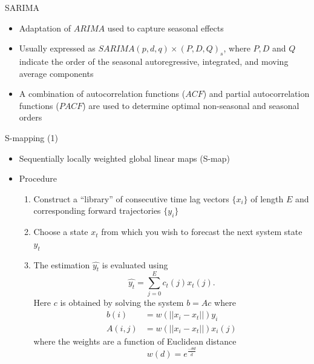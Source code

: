 \documentclass[10pt]{beamer}
\begin{document}
		\begin{frame}{SARIMA}
			\begin{itemize}
				\item Adaptation of $ARIMA$ used to capture seasonal effects
				\item Usually expressed as $SARIMA (p,d,q) \times (P,D,Q)_s$, where $P,D$ and $Q$ indicate the order of the seasonal autoregressive, integrated, and moving average components
				\item A combination of autocorrelation functions ($ACF$) and partial autocorrelation functions ($PACF$) are used to determine optimal non-seasonal and seasonal orders
			\end{itemize}
		\end{frame}

		\begin{frame}{S-mapping (1)}
			\begin{itemize}
				\item Sequentially locally weighted global linear maps (S-map)
				\item Procedure
				\begin{enumerate}
					\item Construct a ``library'' of consecutive time lag vectors $\{x_i\}$ of length $E$ and corresponding forward trajectories $\{y_i\}$
					\item Choose a state $x_t$ from which you wish to forecast the next system state $y_t$
					\item The estimation $\hat{y_t}$ is evaluated using
						\begin{equation*}
							\hat{y_t} = \sum_{j=0}^E c_t(j)x_t(j).
						\end{equation*}
						Here $c$ is obtained by solving the system $b=Ac$ where
						\begin{equation*}
							\begin{array}{rl}
								b(i) 	& = w(||x_i-x_t||) y_i \\
								A(i,j) 	& = w(||x_i-x_t||) x_i(j)
							\end{array}
						\end{equation*}
						where the weights are a function of Euclidean distance
						\begin{equation*}
							w(d) = e^{ \frac{-\theta d}{\bar{d}} }
						\end{equation*}
				\end{enumerate}
			\end{itemize}
		\end{frame}
\end{document}
